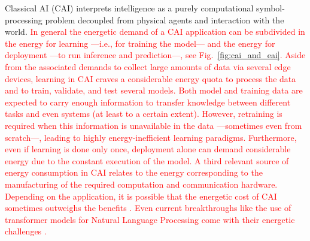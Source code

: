 \documentclass[12pt]{article}
\newcommand\myhl[1]{\textcolor{red}{#1}}
\begin{document}
Classical AI (CAI) interprets intelligence as a purely computational symbol-processing problem decoupled from physical agents and interaction with the world. \myhl{In general the energetic demand of a CAI application can be subdivided in the energy for learning ---i.e., for training the model--- and the energy for deployment ---to run inference and prediction---, see Fig.~\ref{fig:cai_and_eai}. Aside from the associated demands to collect large amounts of data via several edge devices, learning in CAI craves a considerable energy quota to process the data and to train, validate, and test several models. Both model and training data are expected to carry enough information to transfer knowledge between different tasks and even systems (at least to a certain extent). However, retraining is required when this information is unavailable in the data ---sometimes even from scratch---, leading to highly energy-inefficient learning paradigms. Furthermore, even if learning is done only once, deployment alone can demand considerable energy due to the constant execution of the model. A third relevant source of energy consumption in CAI relates to the energy corresponding to the manufacturing of the required computation and communication hardware. Depending on the application, it is possible that the energetic cost of CAI sometimes outweighs the benefits \cite{Strubell2019EnergyPolicyConsiderations}. Even current breakthroughs like the use of transformer models for Natural Language Processing come with their energetic challenges \cite{Cao2020TowardsAccurateReliable}.}
\end{document}
